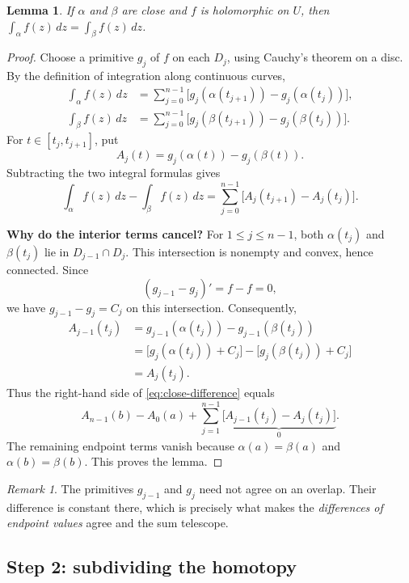 \documentclass[11pt]{article}
\theoremstyle{plain}
\newtheorem{lemma}[theorem]{Lemma}
\theoremstyle{definition}
\theoremstyle{remark}
\newtheorem*{remark}{Remark}
\numberwithin{equation}{section}
\begin{document}
\begin{lemma}\label{lem:close}
If $\alpha$ and $\beta$ are close and $f$ is holomorphic on $U$, then
$\int_\alpha f(z)\,dz=\int_\beta f(z)\,dz$.
\end{lemma}
\begin{proof}
Choose a primitive $g_j$ of $f$ on each $D_j$, using Cauchy's theorem
on a disc. By the definition of
integration along continuous curves,
\begin{align*}
 \int_\alpha f(z)\,dz
 &=\sum_{j=0}^{n-1}\bigl[g_j(\alpha(t_{j+1}))-g_j(\alpha(t_j))\bigr],\\
 \int_\beta f(z)\,dz
 &=\sum_{j=0}^{n-1}\bigl[g_j(\beta(t_{j+1}))-g_j(\beta(t_j))\bigr].
\end{align*}
For $t\in[t_j,t_{j+1}]$, put
\[
 A_j(t)=g_j(\alpha(t))-g_j(\beta(t)).
\]
Subtracting the two integral formulas gives
\begin{equation}\label{eq:close-difference}
 \int_\alpha f(z)\,dz-\int_\beta f(z)\,dz
 =\sum_{j=0}^{n-1}\bigl[A_j(t_{j+1})-A_j(t_j)\bigr].
\end{equation}

\pagebreak[3]
\textbf{Why do the interior terms cancel?}
For $1\leq j\leq n-1$, both $\alpha(t_j)$ and $\beta(t_j)$ lie in
$D_{j-1}\cap D_j$. This intersection is nonempty and convex, hence
connected. Since
\[
 (g_{j-1}-g_j)'=f-f=0,
\]
we have $g_{j-1}-g_j=C_j$ on this intersection. Consequently,
\begin{align*}
 A_{j-1}(t_j)
 &=g_{j-1}(\alpha(t_j))-g_{j-1}(\beta(t_j))\\
 &=\bigl[g_j(\alpha(t_j))+C_j\bigr]
   -\bigl[g_j(\beta(t_j))+C_j\bigr]\\
 &=A_j(t_j).
\end{align*}
Thus the right-hand side of \eqref{eq:close-difference} equals
\[
 A_{n-1}(b)-A_0(a)
 +\sum_{j=1}^{n-1}\underbrace{\bigl[A_{j-1}(t_j)-A_j(t_j)\bigr]}_{0}.
\]
The remaining endpoint terms vanish because $\alpha(a)=\beta(a)$ and
$\alpha(b)=\beta(b)$. This proves the lemma.
\end{proof}

\begin{remark}
The primitives $g_{j-1}$ and $g_j$ need not agree on an overlap.
Their difference is constant there, which is precisely what makes the
\emph{differences of endpoint values} agree and the sum telescope.
\end{remark}

\subsection{Step 2: subdividing the homotopy}
\end{document}
